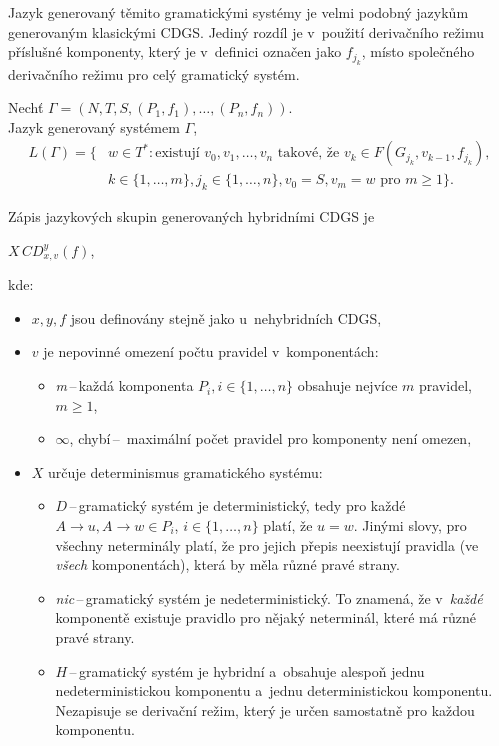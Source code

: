 Jazyk generovaný těmito gramatickými systémy je velmi podobný jazykům generovaným klasickými CDGS.
Jediný rozdíl je v~použití derivačního režimu příslušné komponenty, který je v~definici označen jako $f_{j_k}$, místo společného derivačního režimu pro celý gramatický systém.
\begin{definition}
    Nechť $\Gamma = (N, T, S, (P_1, f_1), \ldots, (P_n, f_n))$.\\
    Jazyk generovaný systémem $\Gamma$,
    \begin{align*}
        L(\Gamma) = \{&w \in T^*: \text{existují } v_0, v_1,\ldots, v_n \text{ takové, že } v_k \in F(G_{j_k}, v_{k-1}, f_{j_k}),\\
        &k \in \{1, \ldots, m\}, j_k \in \{1, \ldots, n\}, v_0 = S, v_m = w \text{ pro } m \geq 1\}.
    \end{align*}
\end{definition}

Zápis jazykových skupin generovaných hybridními CDGS je
\begin{center}
    $X\,CD^y_{x, v}(f) $, 
\end{center}
kde:
\begin{itemize}
    \item $x, y, f$ jsou definovány stejně jako u~nehybridních CDGS,
    \item $v$ je nepovinné omezení počtu pravidel v~komponentách:
    \begin{itemize}[label=$\circ$]
        \item \emph{m}\,--\,každá komponenta $P_i, i \in \{1, \ldots, n\}$ obsahuje nejvíce $m$ pravidel, $m \geq 1$,
        \item $\infty$, chybí\,--\, maximální počet pravidel pro komponenty není omezen,
    \end{itemize}
    \item $X$ určuje determinismus gramatického systému:
    \begin{itemize}[label=$\circ$]
        \item $D$\,--\,gramatický systém je deterministický, tedy pro každé $A \rightarrow u, A \rightarrow w \in P_i$, $i \in \{1, \ldots, n\}$ platí, že $u = w$.
        Jinými slovy, pro všechny neterminály platí, že pro jejich přepis neexistují pravidla (ve \emph{všech} komponentách), která by měla různé pravé strany.
        \item \emph{nic}\,--\,gramatický systém je nedeterministický.
        To znamená, že v~\emph{každé} komponentě existuje pravidlo pro nějaký neterminál, které má různé pravé strany.
        \item $H$\,--\,gramatický systém je hybridní a~obsahuje alespoň jednu nedeterministickou komponentu a~jednu deterministickou komponentu.
        Nezapisuje se derivační režim, který je určen samostatně pro každou komponentu. 
    \end{itemize}
\end{itemize}

